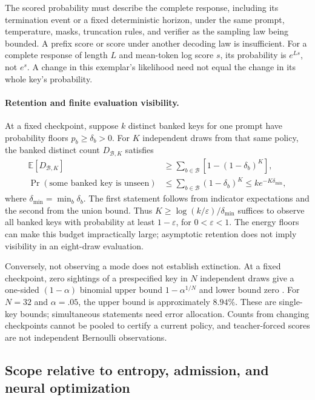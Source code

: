 The scored probability must describe the complete response, including its
termination event or a fixed deterministic horizon, under the same prompt,
temperature, masks, truncation rules, and verifier as the sampling law being
bounded. A prefix score or score under another decoding law is insufficient.
For a complete response of length $L$ and mean-token log score $s$, its
probability is $e^{Ls}$, not $e^s$. A change in this exemplar's likelihood
need not equal the change in its whole key's probability.

\paragraph{Retention and finite evaluation visibility.}
At a fixed checkpoint, suppose $k$ distinct banked keys for one prompt have
probability floors $p_b\ge\delta_b>0$. For $K$ independent draws from that
same policy, the banked distinct count $D_{\mathcal B,K}$ satisfies
\[
 \begin{aligned}
 \mathbb E[D_{\mathcal B,K}]
 &\ge\sum_{b\in\mathcal B}\left[1-(1-\delta_b)^K\right],\\
 \Pr(\text{some banked key is unseen})
 &\le\sum_{b\in\mathcal B}(1-\delta_b)^K
 \le k e^{-K\delta_{\min}},
 \end{aligned}
\]
where $\delta_{\min}=\min_b\delta_b$. The first statement follows from
indicator expectations and the second from the union bound. Thus
$K\ge\log(k/\varepsilon)/\delta_{\min}$ suffices to observe all banked keys
with probability at least $1-\varepsilon$, for $0<\varepsilon<1$.
The energy floors can make this budget impractically large; asymptotic
retention does not imply visibility in an eight-draw evaluation.

Conversely, not observing a mode does not establish extinction. At a fixed
checkpoint, zero sightings of a prespecified key in $N$ independent draws
give a one-sided $(1-\alpha)$ binomial upper bound
$1-\alpha^{1/N}$ and lower bound zero \citep{clopper1934binomial}. For
$N=32$ and $\alpha=.05$, the upper bound is approximately $8.94\%$.
These are single-key bounds; simultaneous statements need error allocation.
Counts from changing checkpoints cannot be pooled to certify a current
policy, and teacher-forced scores are not independent Bernoulli observations.

\subsection{Scope relative to entropy, admission, and neural optimization}
\label{app:theory-entropy}
\label{app:theory-entropy-comparison}

